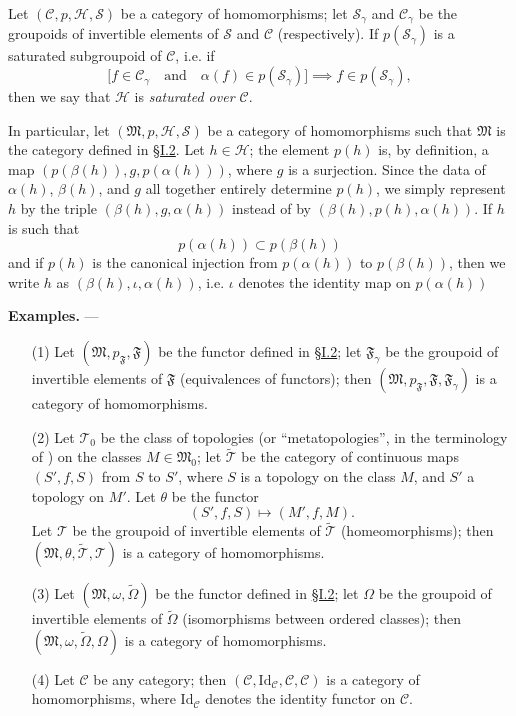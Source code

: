 \documentclass[a4paper,oneside,nobib,nofonts,notitlepage,notoc,nols,fleqn,justified]{tufte-book}
\newenvironment{rmenv}[1]
  {\phantomsection\par\medskip\noindent\textbf{#1.}\rmfamily}
  {\par\medskip}
\newcommand{\oldpage}[1]{{\reversemarginpar\marginnote{\raggedleft\footnotesize\textit{p.~#1}}}}
\newcommand{\CC}{\mathcal{C}}
\newcommand{\HH}{\mathcal{H}}
\renewcommand{\SS}{\mathcal{S}}
\newcommand{\MM}{\mathfrak{M}}
\newcommand{\FF}{\mathfrak{F}}
\newcommand{\TT}{\mathcal{T}}
\newcommand{\Id}{\mathrm{Id}}
\begin{document}
Let $(\CC,p,\HH,\SS)$ be a category of homomorphisms;
let $\SS_\gamma$ and $\CC_\gamma$ be the groupoids of invertible elements of $\SS$ and $\CC$ (respectively).
If $p(\SS_\gamma)$ is a saturated \cite{3a} subgroupoid of $\CC$, i.e. if
\[
  \big[f\in\CC_\gamma
  \quad\text{and}\quad
  \alpha(f)\in p(\SS_\gamma)\big]
  \implies
  f\in p(\SS_\gamma),
\]
then we say that $\HH$ is \emph{saturated over $\CC$}.

In particular, let $(\MM,p,\HH,\SS)$ be a category of homomorphisms such that $\MM$ is the category defined in \hyperref[section:i.2]{§I.2}.
Let $h\in\HH$;
the element $p(h)$ is, by definition, a map $(p(\beta(h)),g,p(\alpha(h)))$, where $g$ is a surjection.
Since the data of $\alpha(h)$, $\beta(h)$, and $g$ all together entirely determine $p(h)$, we simply represent $h$ by the triple $(\beta(h),g,\alpha(h))$ instead of by $(\beta(h),p(h),\alpha(h))$.
If $h$ is such that
\[
  p(\alpha(h))
  \subset p(\beta(h))
\]
and if $p(h)$ is the canonical injection from $p(\alpha(h))$ to $p(\beta(h))$, then we write $h$ as $(\beta(h),\iota,\alpha(h))$, i.e. $\iota$ denotes the identity map on $p(\alpha(h))$

\begin{rmenv}{Examples}
  ---
  \begin{enumerate}
    \item[\normalfont(1)]
      \oldpage{358}
      Let $(\MM,p_\FF,\FF)$ be the functor defined in \hyperref[section:i.2]{§I.2};
      let $\FF_\gamma$ be the groupoid of invertible elements of $\FF$ (equivalences of functors);
      then $(\MM,p_\FF,\FF,\FF_\gamma)$ is a category of homomorphisms.
    \item[\normalfont(2)]
      Let $\TT_0$ be the class of topologies (or ``metatopologies'', in the terminology of \cite{3b}) on the classes $M\in\MM_0$;
      let $\widetilde{\TT}$ be the category of continuous maps $(S',f,S)$ from $S$ to $S'$, where $S$ is a topology on the class $M$, and $S'$ a topology on $M'$.
      Let $\theta$ be the functor
      \[
        (S',f,S)
        \longmapsto(M',f,M).
      \]
      Let $\TT$ be the groupoid of invertible elements of $\widetilde{\TT}$ (homeomorphisms);
      then $(\MM,\theta,\widetilde{\TT},\TT)$ is a category of homomorphisms.
    \item[\normalfont(3)]
      Let $(\MM,\omega,\widetilde{\Omega})$ be the functor defined in \hyperref[section:i.2]{§I.2};
      let $\Omega$ be the groupoid of invertible elements of $\widetilde{\Omega}$ (isomorphisms between ordered classes);
      then $(\MM,\omega,\widetilde{\Omega},\Omega)$ is a category of homomorphisms.
    \item[\normalfont(4)]
      Let $\CC$ be any category;
      then $(\CC,\Id_\CC,\CC,\CC)$ is a category of homomorphisms, where $\Id_\CC$ denotes the identity functor on $\CC$.
  \end{enumerate}
\end{rmenv}
\end{document}
